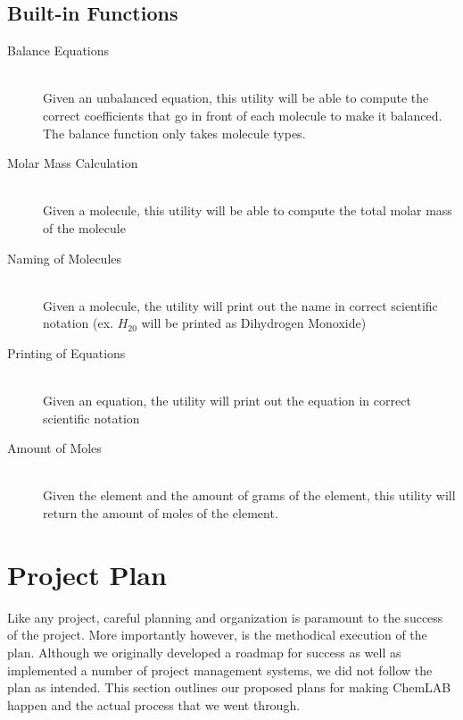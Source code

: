 \documentclass[11pt]{report}
\begin{document}
\section{Built-in Functions}
\begin{description}
	\item[Balance Equations] \hfill \\
	Given an unbalanced equation, this utility will be able to compute the correct coefficients that go in front of each molecule to make it balanced. The balance function only takes molecule types. 

	\item[Molar Mass Calculation] \hfill \\
	Given a molecule, this utility will be able to compute the total molar mass of the molecule

	\item[Naming of Molecules] \hfill \\
	Given a molecule, the utility will print out the name in correct scientific notation (ex. $H_20$ will be printed as Dihydrogen Monoxide) 

	\item[Printing of Equations] \hfill \\
	Given an equation, the utility will print out the equation in correct scientific notation 

	\item[Amount of Moles] \hfill \\
	Given the element and the amount of grams of the element, this utility will return the amount of moles of the element.
\end{description}

\chapter{Project Plan}
Like any project, careful planning and organization is paramount to the success of the project. More importantly however, is the methodical execution of the plan. Although we originally developed a roadmap for success as well as implemented a number of project management systems, we did not follow the plan as intended. This section outlines our proposed plans for making ChemLAB happen and the actual process that we went through. 
\end{document}
